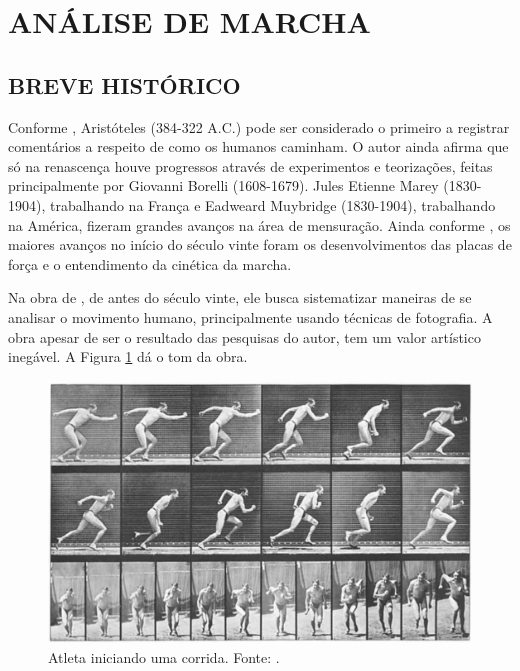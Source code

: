 \section{ANÁLISE DE MARCHA}


\subsection{BREVE HISTÓRICO} 

Conforme , Aristóteles (384-322 A.C.) pode ser considerado o primeiro a registrar comentários a respeito de como os humanos caminham. 
O autor ainda afirma que só na renascença houve progressos através de experimentos e teorizações, feitas principalmente por Giovanni Borelli (1608-1679). Jules Etienne Marey (1830-1904), trabalhando na França e Eadweard Muybridge (1830-1904), trabalhando na América, fizeram grandes avanços na área de mensuração.
Ainda conforme , os maiores avanços no início do século vinte foram os desenvolvimentos das placas de força e o entendimento da cinética da marcha.

Na obra de , de antes do século vinte, ele busca sistematizar maneiras de se analisar o movimento humano, principalmente usando técnicas de fotografia. 
A obra apesar de ser o resultado das pesquisas do autor, tem um valor artístico inegável.  
A Figura \ref{inicio_corrida} dá o tom da obra.

\begin{figure}[ht]
	\centering
	\includegraphics[width=15cm]{figuras/inicio_corrida.eps}
	\caption{Atleta iniciando uma corrida. Fonte: .}
	\label{inicio_corrida}
\end{figure}


